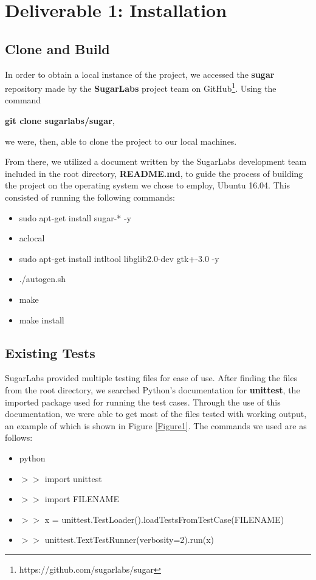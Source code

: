 \documentclass{article}
\begin{document}
\section{Deliverable 1: Installation}
\subsection{Clone and Build}
In order to obtain a local instance of the project, we accessed the \textbf{sugar} repository made by the \textbf{SugarLabs} project team on GitHub\footnote{https://github.com/sugarlabs/sugar}. Using the command 
\begin{center}
\textbf{git clone sugarlabs/sugar},
\end{center}
we were, then, able to clone the project to our local machines.

From there, we utilized a document written by the SugarLabs development team included in the root directory, \textbf{README.md}, to guide the process of building the project on the operating system we chose to employ, Ubuntu 16.04. This consisted of running the following commands:
\begin{itemize}
\itemsep-0.5em
\item[] sudo apt-get install sugar-* -y
\item[] aclocal
\item[] sudo apt-get install intltool libglib2.0-dev gtk+-3.0 -y
\item[] ./autogen.sh
\item[] make
\item[] make install
\end{itemize}
\subsection{Existing Tests}
SugarLabs provided multiple testing files for ease of use. After finding the files from the root directory, we searched Python's documentation for \textbf{unittest}, the imported package used for running the test cases. Through the use of this documentation, we were able to get most of the files tested with working output, an example of which is shown in Figure \ref{Figure1}. The commands we used are as follows:
\begin{itemize}
\itemsep-0.5em
\item[] python
\item[] $>>$ import unittest
\item[] $>>$ import FILENAME
\item[] $>>$ x = unittest.TestLoader().loadTestsFromTestCase(FILENAME)
\item[] $>>$ unittest.TextTestRunner(verbosity=2).run(x)
\end{itemize}
\end{document}
